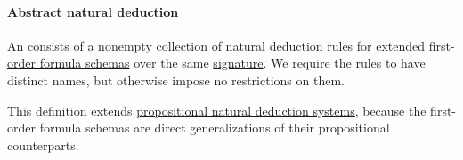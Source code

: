\paragraph{Abstract natural deduction}

\begin{definition}\label{def:fol_natural_deduction_system}\mimprovised
  An  consists of a nonempty collection of \hyperref[def:natural_deduction_rule]{natural deduction rules} for \hyperref[def:fol_formula_schema]{extended first-order formula schemas} over the same \hyperref[def:fol_signature]{signature}. We require the rules to have distinct names, but otherwise impose no restrictions on them.
\end{definition}
\begin{comments}
  \item This definition extends \hyperref[def:propositional_natural_deduction_system]{propositional natural deduction systems}, because the first-order formula schemas are direct generalizations of their propositional counterparts.
\end{comments}

